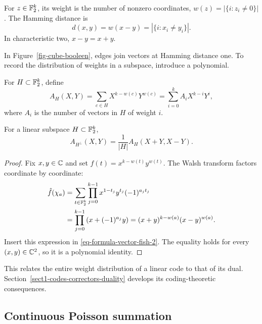 
\begin{defn}
\label{notation-38}\label{notation-39}
For $z\in\mathbb{F}_2^k$, its weight is the number of nonzero coordinates,
$w(z)=|\{i:z_i\neq0\}|$. The Hamming distance is
\[
 d(x,y)=w(x-y)=|\{i:x_i\neq y_i\}|.
\]
In characteristic two, $x-y=x+y$.
\end{defn}
In Figure~\ref{fig-cube-booleen}, edges join vectors at Hamming distance one.
To record the distribution of weights in a subspace, introduce a polynomial.

\begin{defn}
\label{notation-40}
For $H\subset\mathbb{F}_2^k$, define
\[
 A_H(X,Y)=\sum_{c\in H}X^{k-w(c)}Y^{w(c)}
 =\sum_{i=0}^k A_iX^{k-i}Y^i,
\]
where $A_i$ is the number of vectors in $H$ of weight $i$.
\end{defn}


\begin{thm}
\label{thm-id-mac-williams}
For a linear subspace $H\subset\mathbb{F}_2^k$,
\[
 A_{H^\perp}(X,Y)=\frac1{|H|}A_H(X+Y,X-Y).
\]
\end{thm}
\begin{proof}
Fix $x,y\in\mathbb{C}$ and set $f(t)=x^{k-w(t)}y^{w(t)}$.
The Walsh transform factors coordinate by coordinate:
\begin{align*}
 \hat{f}(\chi_a)
 &=\sum_{t\in\mathbb{F}_2^k}\prod_{j=0}^{k-1}
              x^{1-t_j}y^{t_j}(-1)^{a_jt_j}\\
 &=\prod_{j=0}^{k-1}\left(x+(-1)^{a_j}y\right)
 =(x+y)^{k-w(a)}(x-y)^{w(a)}.
\end{align*}
Insert this expression in \eqref{eq-formula-vector-fish-2}.
The equality holds for every $(x,y)\in\mathbb{C}^2$, so it is a polynomial identity.
\end{proof}
This relates the entire weight distribution of a linear code to that of its
dual. Section~\ref{sect1-codes-correctors-duality} develops its coding-theoretic
consequences.

\subsection{Continuous Poisson summation}

